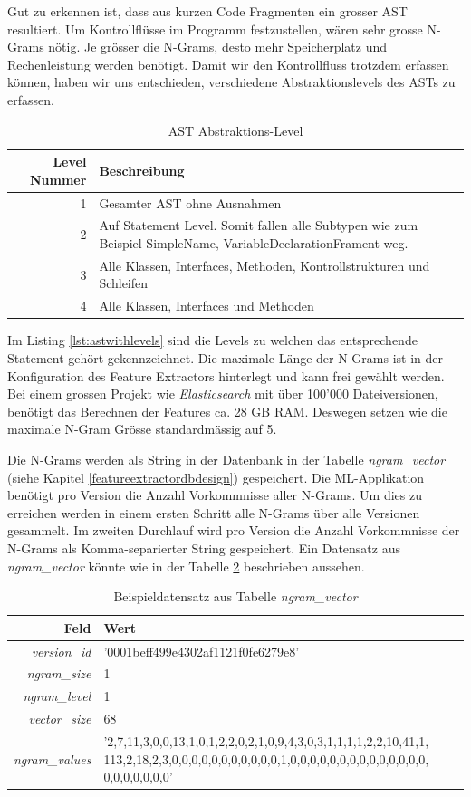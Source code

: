 \documentclass[10pt, a4paper]{article}
\begin{document}
Gut zu erkennen ist, dass aus kurzen Code Fragmenten ein grosser \ac{AST} resultiert. Um Kontrollflüsse im Programm festzustellen, wären sehr grosse N-Grams nötig. Je grösser die N-Grams, desto mehr Speicherplatz und Rechenleistung werden benötigt. Damit wir den Kontrollfluss trotzdem erfassen können, haben wir uns entschieden, verschiedene Abstraktionslevels des \acp{AST} zu erfassen.  
\begin{table}[H]
	\begin{tabular}{r|p{7.75cm}}
		\textbf{Level Nummer} & \textbf{Beschreibung}\\
		\hline
		1 & Gesamter \ac{AST} ohne Ausnahmen\\
		2 & Auf Statement Level. Somit fallen alle Subtypen wie zum Beispiel SimpleName, VariableDeclarationFrament weg.\\
		3 &  Alle Klassen, Interfaces, Methoden, Kontrollstrukturen und Schleifen\\
		4 &  Alle Klassen, Interfaces und Methoden\\
	\end{tabular}
	\caption{AST Abstraktions-Level}
	\label{tab:astabstractionlevel}
\end{table}
Im Listing \ref{lst:astwithlevels} sind die Levels zu welchen das entsprechende Statement gehört gekennzeichnet.
Die maximale Länge der N-Grams ist in der Konfiguration des Feature Extractors hinterlegt und kann frei gewählt werden. Bei einem grossen Projekt wie \emph{Elasticsearch} mit über 100'000 Dateiversionen, benötigt das Berechnen der Features ca. 28 GB RAM. Deswegen setzen wie die maximale N-Gram Grösse standardmässig auf 5.

Die N-Grams werden als String in der Datenbank in der Tabelle \emph{ngram\_vector} (siehe Kapitel \ref{featureextractordbdesign}) gespeichert. Die \ac{ML}-Applikation benötigt pro Version die Anzahl Vorkommnisse aller N-Grams. Um dies zu erreichen werden in einem ersten Schritt alle N-Grams über alle Versionen gesammelt. Im zweiten Durchlauf wird pro Version die Anzahl Vorkommnisse der N-Grams als Komma-separierter String gespeichert. Ein Datensatz aus \emph{ngram\_vector} könnte wie in der Tabelle \ref{tab:ngram_vector_example} beschrieben aussehen.

\begin{table}[H]
	\begin{tabular}{|r|p{9cm}|}
		 \hline
		\textbf{Feld} & \textbf{Wert}  \\ \hline
		\emph{version\_id}		& '0001beff499e4302af1121f0fe6279e8' \\ \hline
		\emph{ngram\_size}		& 1 \\ \hline
		\emph{ngram\_level}		& 1 \\ \hline
		\emph{vector\_size}		& 68 \\ \hline
		\emph{ngram\_values}	& '2,7,11,3,0,0,13,1,0,1,2,2,0,2,1,0,9,4,3,0,3,1,1,1,1,2,2,10,41,1,
		113,2,18,2,3,0,0,0,0,0,0,0,0,0,0,0,1,0,0,0,0,0,0,0,0,0,0,0,0,0,0,
		0,0,0,0,0,0,0' \\ \hline
	\end{tabular}
	\centering
	\caption{Beispieldatensatz aus Tabelle \emph{ngram\_vector}}
	\label{tab:ngram_vector_example}
\end{table}
\end{document}
